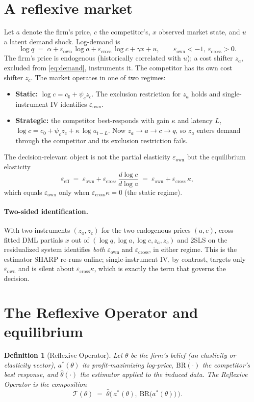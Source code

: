\documentclass[11pt]{article}
\newtheorem{definition}{Definition}
\newcommand{\Tcal}{\mathcal{T}}
\newcommand{\eps}{\varepsilon}
\newcommand{\epsown}{\eps_{\mathrm{own}}}
\newcommand{\epscross}{\eps_{\mathrm{cross}}}
\newcommand{\epseff}{\eps_{\mathrm{eff}}}
\newcommand{\loga}{\log a}
\newcommand{\logc}{\log c}
\newcommand{\logq}{\log q}
\begin{document}
\section{A reflexive market}\label{sec:model}
Let $a$ denote the firm's price, $c$ the competitor's, $x$ observed market state, and $u$ a
latent demand shock. Log-demand is
\begin{equation}
\logq \;=\; \alpha + \epsown\,\loga + \epscross\,\logc + \gamma x + u, \qquad \epsown < -1,\ \epscross>0.
\label{eq:demand}
\end{equation}
The firm's price is endogenous (historically correlated with $u$); a cost shifter $z_a$,
excluded from \eqref{eq:demand}, instruments it. The competitor has its own cost shifter $z_c$.
The market operates in one of two regimes:
\begin{itemize}
\item \textbf{Static:} $\logc = c_0 + \psi_c z_c$. The exclusion restriction for $z_a$ holds and
single-instrument IV identifies $\epsown$.
\item \textbf{Strategic:} the competitor best-responds with gain $\kappa$ and latency $L$,
$\logc = c_0 + \psi_c z_c + \kappa\,\log a_{t-L}$. Now
$z_a \to a \to c \to q$, so $z_a$ enters demand through the competitor and its exclusion
restriction fails.
\end{itemize}
The decision-relevant object is not the partial elasticity $\epsown$ but the equilibrium
elasticity
\begin{equation}
\epseff \;=\; \epsown + \epscross\,\frac{d\logc}{d\loga} \;=\; \epsown + \epscross\,\kappa,
\label{eq:eff}
\end{equation}
which equals $\epsown$ only when $\epscross\kappa=0$ (the static regime).

\paragraph{Two-sided identification.} With two instruments $(z_a,z_c)$ for the two endogenous
prices $(a,c)$, cross-fitted DML partials $x$ out of $(\logq,\loga,\logc,z_a,z_c)$ and 2SLS on the
residualized system identifies \emph{both} $\epsown$ and $\epscross$, in either regime. This is
the estimator SHARP re-runs online; single-instrument IV, by contrast, targets only $\epsown$
and is silent about $\epscross\kappa$, which is exactly the term that governs the decision.

\section{The Reflexive Operator and equilibrium}\label{sec:operator}
\begin{definition}[Reflexive Operator]
Let $\theta$ be the firm's belief (an elasticity or elasticity vector), $a^*(\theta)$ its
profit-maximizing log-price, $\mathrm{BR}(\cdot)$ the competitor's best response, and
$\hat\theta(\cdot)$ the estimator applied to the induced data. The Reflexive Operator is the
composition
\[
\Tcal(\theta) \;=\; \hat\theta\Big(\, a^*(\theta),\ \mathrm{BR}\big(a^*(\theta)\big)\,\Big).
\]
\end{definition}
\end{document}
